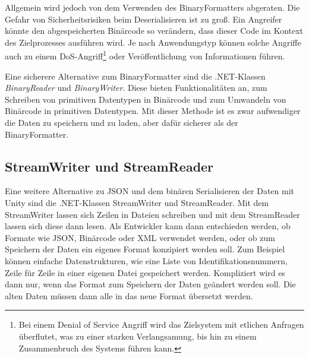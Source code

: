 Allgemein wird jedoch von dem Verwenden des BinaryFormatters abgeraten. Die Gefahr von Sicherheitsrisiken beim Deserialisieren ist zu groß. Ein Angreifer könnte den abgespeicherten Binärcode so verändern, dass dieser Code im Kontext des Zielprozesses ausführen wird. Je nach Anwendungstyp können solche Angriffe auch zu einem DoS-Angriff\footnote{Bei einem Denial of Service Angriff wird das Zielsystem mit etlichen Anfragen überflutet, was zu einer starken Verlangsamung, bis hin zu einem Zusammenbruch des Systems führen kann.\cite{bundDoSDDoSAttacken}} oder Veröffentlichung von Informationen führen.\cite{microsoftDeserializationRisks}

Eine sicherere Alternative zum BinaryFormatter sind die .NET-Klassen \textit{BinaryReader} und \textit{BinaryWriter}. Diese bieten Funktionalitäten an, zum Schreiben von primitiven Datentypen in Binärcode und zum Umwandeln von Binärcode in primitiven Datentypen. Mit dieser Methode ist es zwar aufwendiger die Daten zu speichern und zu laden, aber dafür sicherer als der BinaryFormatter.\cite{microsoftBinaryReaderClass}\cite{microsoftBinaryWriterClass}

\subsection{StreamWriter und StreamReader}
Eine weitere Alternative zu JSON und dem binären Serialisieren der Daten mit Unity sind die .NET-Klassen StreamWriter und StreamReader. Mit dem StreamWriter lassen sich Zeilen in Dateien schreiben und mit dem StreamReader lassen sich diese dann lesen.\cite{microsoftStreamWriterKlasse}\cite{microsoftStreamReaderKlasse} Als Entwickler kann dann entschieden werden, ob Formate wie JSON, Binärcode oder XML verwendet werden, oder ob zum Speichern der Daten ein eigenes Format konzipiert werden soll. Zum Beispiel können einfache Datenstrukturen, wie eine Liste von Identifikationsnummern, Zeile für Zeile in einer eigenen Datei gespeichert werden. Kompliziert wird es dann nur, wenn das Format zum Speichern der Daten geändert werden soll. Die alten Daten müssen dann alle in das neue Format übersetzt werden.


